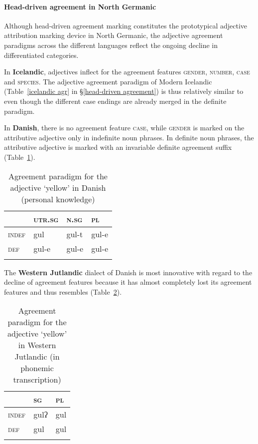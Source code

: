 \paragraph*{Head\hyp{}driven agreement in North Germanic} 
Although head\hyp{}driven agreement marking constitutes the prototypical adjective attribution marking device in North Germanic, the adjective agreement paradigms across the different languages reflect the ongoing decline in differentiated categories.

In \textbf{Icelandic}, adjectives inflect for the agreement features \textsc{gender}, \textsc{number}, \textsc{case} and \textsc{species}. The adjective agreement paradigm of Modern Icelandic (Table~\ref{icelandic agr} in \S\ref{head-driven agreement}) is thus relatively similar to  even though the different case endings are already merged in the definite paradigm.

In \textbf{Danish},\label{danish synchr} there is no agreement feature \textsc{case}, while \textsc{gender} is marked on the attributive adjective only in indefinite noun phrases. In definite noun phrases, the attributive adjective is marked with an invariable definite agreement suffix (Table~\ref{danish agr paradigm}).
\begin{table}
\begin{tabular}{l l l l}
\lsptoprule
		& \textsc{utr.sg}	&\textsc{n.sg}	&\textsc{pl}\\
\midrule
\textsc{indef}	&gul	 	&gul-t		&gul-e\\

\textsc{def}	&gul-e	&gul-e		&gul-e\\
\lspbottomrule
\end{tabular}
\caption[Adjective paradigm for Danish]{Agreement paradigm for the adjective ‘yellow’ in Danish (personal knowledge)}
\label{danish agr paradigm}
\end{table}

The \textbf{Western Jutlandic} dialect of Danish is most innovative with regard to the decline of agreement features because it has almost completely lost its agreement features and thus resembles  (Table~\ref{jutl agr paradigm}).
\begin{table}
\begin{tabular}{l l l}
\lsptoprule		& \textsc{sg}	&\textsc{pl}\\
\midrule
\textsc{indef}	& gulʔ	 	&gul\\

\textsc{def}	&gul			&gul\\
\lspbottomrule
\end{tabular}
\caption[Adjective paradigm for W-Jutlandic]{Agreement paradigm for the adjective ‘yellow’ in Western Jutlandic (in phonemic transcription) \citep{ringgaard1960}}
\label{jutl agr paradigm}
\end{table}

